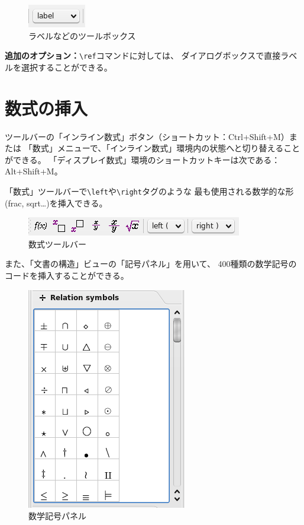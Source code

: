 \begin{figure}[H]
  \centering
  \includegraphics{doc10.png}
  \caption{ラベルなどのツールボックス}
\end{figure}

\textbf{追加のオプション：}\verb+\ref+コマンドに対しては、
ダイアログボックスで直接ラベルを選択することができる。

\section{数式の挿入}

ツールバーの「インライン数式」ボタン（ショートカット：Ctrl+Shift+M）または
「数式」メニューで、「インライン数式」環境内の状態へと切り替えることができる。
「ディスプレイ数式」環境のショートカットキーは次である：Alt+Shift+M。

「数式」ツールバーで\verb+\left+や\verb+\right+タグのような
最も使用される数学的な形(frac, sqrt\ldots{})を挿入できる。

\begin{figure}[H]
  \centering
  \includegraphics{doc11.png}
  \caption{数式ツールバー}
\end{figure}

また、「文書の構造」ビューの「記号パネル」を用いて、
400種類の数学記号のコードを挿入することができる。

\begin{figure}[H]
  \centering
  \includegraphics{doc12.png}
  \caption{数学記号パネル}
\end{figure}

